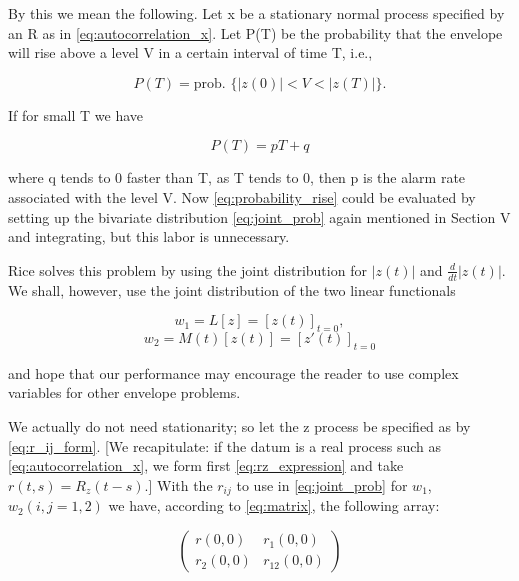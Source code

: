 \documentclass[10pt,twocolumn]{article}
\theoremstyle{definition}
\begin{document}
By this we mean the following. Let x be a stationary normal process specified by an R as in \eqref{eq:autocorrelation_x}. Let P(T) be the probability that the envelope will rise above a level V in a certain interval of time T, i.e.,

\begin{equation}
\label{eq:probability_rise}
P(T) = \text{prob. }\{|z(0)| < V < |z(T)|\}.
\end{equation}

If for small T we have

\begin{equation}
\label{eq:small_t}
P(T) = pT + q
\end{equation}

where q tends to 0 faster than T, as T tends to 0, then p is the alarm rate associated with the level V. Now \eqref{eq:probability_rise} could be evaluated by setting up the bivariate distribution \eqref{eq:joint_prob} again mentioned in Section V and integrating, but this labor is unnecessary.

Rice\cite{rice} solves this problem by using the joint distribution for $|z(t)|$ and $\frac{d}{dt}|z(t)|$. We shall, however, use the joint distribution of the two linear functionals

\begin{equation}
\label{eq:linear_functionals_specific}
w_1 = L[z] = [z(t)]_{t=0},
\end{equation}
\begin{equation}
w_2 = M(t) [z(t)] = [z'(t)]_{t=0}
\end{equation}

and hope that our performance may encourage the reader to use complex variables for other envelope problems.

We actually do not need stationarity; so let the z process be specified as by \eqref{eq:r_ij_form}. [We recapitulate: if the datum is a real process such as \eqref{eq:autocorrelation_x}, we form first \eqref{eq:rz_expression} and take $r(t, s) = R_z(t - s)$.] With the $r_{ij}$ to use in \eqref{eq:joint_prob} for $w_1$, $w_2(i, j = 1, 2)$ we have, according to \eqref{eq:matrix}, the following array:

\begin{equation}
\label{eq:array_matrix}
\begin{pmatrix}
r(0, 0) & r_1(0, 0) \\
r_2(0, 0) & r_{12}(0, 0)
\end{pmatrix}
\end{equation}
\end{document}
